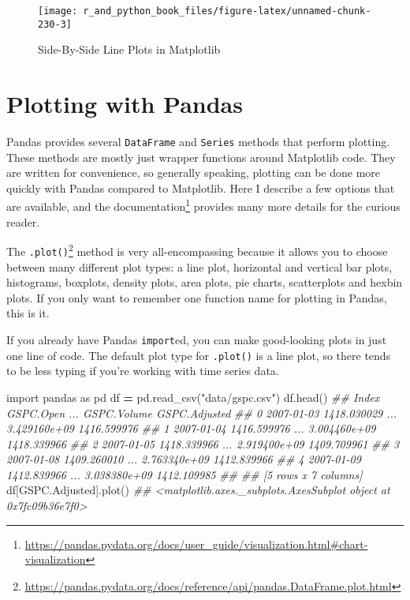 \documentclass[
  12pt,
  krantz2]{krantz}
\makeatletter
\newenvironment{Shaded}{\begin{snugshade}}{\end{snugshade}}
\newcommand{\CommentTok}[1]{\textcolor[rgb]{0.37,0.37,0.37}{\textit{#1}}}
\newcommand{\ImportTok}[1]{#1}
\newcommand{\NormalTok}[1]{#1}
\newcommand{\OperatorTok}[1]{\textcolor[rgb]{0.43,0.43,0.43}{\textbf{#1}}}
\newcommand{\StringTok}[1]{\textcolor[rgb]{0.5,0.5,0.5}{#1}}
\renewcommand{\href}[2]{#2\footnote{\url{#1}}}
\newenvironment{kframe}{%
\medskip{}
\setlength{\fboxsep}{.8em}
 \def\at@end@of@kframe{}%
 \ifinner\ifhmode%
  \def\at@end@of@kframe{\end{minipage}}%
  \begin{minipage}{\columnwidth}%
 \fi\fi%
 \def\FrameCommand##1{\hskip\@totalleftmargin \hskip-\fboxsep
 \colorbox{shadecolor}{##1}\hskip-\fboxsep
     \hskip-\linewidth \hskip-\@totalleftmargin \hskip\columnwidth}%
 \MakeFramed {\advance\hsize-\width
   \@totalleftmargin\z@ \linewidth\hsize
   \@setminipage}}%
 {\par\unskip\endMakeFramed%
 \at@end@of@kframe}
\renewenvironment{Shaded}{\begin{kframe}}{\end{kframe}}
\makeatother
\begin{document}
\begin{figure}

{\centering \texttt{[image: r\_and\_python\_book\_files/figure-latex/unnamed-chunk-230-3]} 

}

\caption{Side-By-Side Line Plots in Matplotlib}\label{fig:unnamed-chunk-230}
\end{figure}

\hypertarget{plotting-with-pandas}{%
\section{Plotting with Pandas}\label{plotting-with-pandas}}

Pandas provides several \texttt{DataFrame} and \texttt{Series} methods that perform plotting. These methods are mostly just wrapper functions around Matplotlib code. They are written for convenience, so generally speaking, plotting can be done more quickly with Pandas compared to Matplotlib. Here I describe a few options that are available, and \href{https://pandas.pydata.org/docs/user_guide/visualization.html\#chart-visualization}{the documentation} provides many more details for the curious reader.

The \href{https://pandas.pydata.org/docs/reference/api/pandas.DataFrame.plot.html}{\texttt{.plot()}} method is very all-encompassing because it allows you to choose between many different plot types: a line plot, horizontal and vertical bar plots, histograms, boxplots, density plots, area plots, pie charts, scatterplots and hexbin plots. If you only want to remember one function name for plotting in Pandas, this is it.

If you already have Pandas \texttt{import}ed, you can make good-looking plots in just one line of code. The default plot type for \texttt{.plot()} is a line plot, so there tends to be less typing if you're working with time series data.

\begin{Shaded}
\begin{Highlighting}[]
\ImportTok{import}\NormalTok{ pandas }\ImportTok{as}\NormalTok{ pd}
\NormalTok{df }\OperatorTok{=}\NormalTok{ pd.read\_csv(}\StringTok{"data/gspc.csv"}\NormalTok{)}
\NormalTok{df.head()}
\CommentTok{\#\#         Index    GSPC.Open  ...   GSPC.Volume  GSPC.Adjusted}
\CommentTok{\#\# 0  2007{-}01{-}03  1418.030029  ...  3.429160e+09    1416.599976}
\CommentTok{\#\# 1  2007{-}01{-}04  1416.599976  ...  3.004460e+09    1418.339966}
\CommentTok{\#\# 2  2007{-}01{-}05  1418.339966  ...  2.919400e+09    1409.709961}
\CommentTok{\#\# 3  2007{-}01{-}08  1409.260010  ...  2.763340e+09    1412.839966}
\CommentTok{\#\# 4  2007{-}01{-}09  1412.839966  ...  3.038380e+09    1412.109985}
\CommentTok{\#\# }
\CommentTok{\#\# [5 rows x 7 columns]}
\NormalTok{df[}\StringTok{\textquotesingle{}GSPC.Adjusted\textquotesingle{}}\NormalTok{].plot()}
\CommentTok{\#\# \textless{}matplotlib.axes.\_subplots.AxesSubplot object at 0x7fc09b36e7f0\textgreater{}}
\end{Highlighting}
\end{Shaded}
\end{document}

